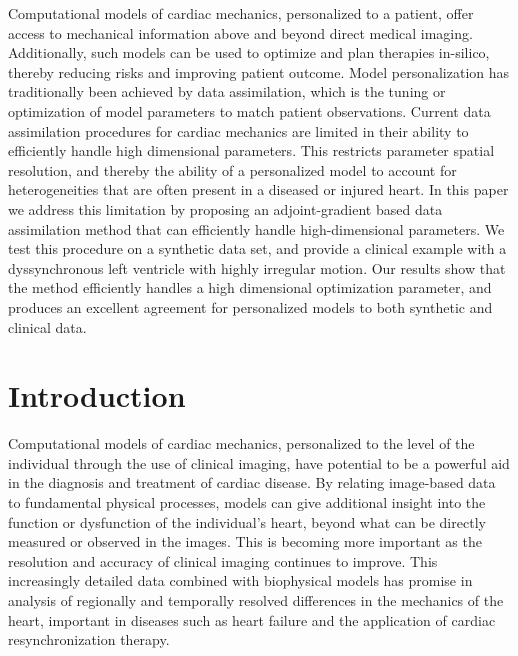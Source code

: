 Computational models of cardiac mechanics, personalized to a patient, offer access 
to mechanical information above and beyond direct medical imaging.
Additionally, such models
can be used to optimize and plan therapies in-silico, thereby reducing risks and
improving patient outcome. Model personalization has traditionally been achieved by data
assimilation, which is the tuning or optimization of model parameters
to match patient observations.
Current data assimilation procedures for cardiac mechanics are limited in their ability
to efficiently handle high dimensional parameters.
This restricts parameter spatial resolution, and thereby the ability
of a personalized model to account for heterogeneities that are often present in
a diseased or injured heart.
In this paper we address this limitation by
proposing an adjoint-gradient based data assimilation method
that can efficiently handle high-dimensional
parameters. We test this procedure on a synthetic data set,
and provide a clinical example with
a dyssynchronous left ventricle with highly irregular motion.
Our results show that the method efficiently handles a high dimensional
optimization parameter, and produces an excellent agreement
for personalized models to both synthetic and clinical data.


\newpage
\section{Introduction}
Computational models of cardiac mechanics, personalized to the level of the individual 
through the use of clinical imaging, have potential to be a powerful aid in the diagnosis and 
treatment of cardiac disease.  By relating image-based data to fundamental physical 
processes, models can give additional insight into the function or dysfunction of the 
individual's heart, beyond what can be directly measured or observed in the images. 
This is becoming more important as the resolution and accuracy of clinical imaging continues to 
improve.  This increasingly detailed data combined with biophysical models has promise 
in analysis of regionally and temporally resolved differences in the mechanics of the heart, 
important in diseases such as heart failure and the application of cardiac resynchronization therapy. 

